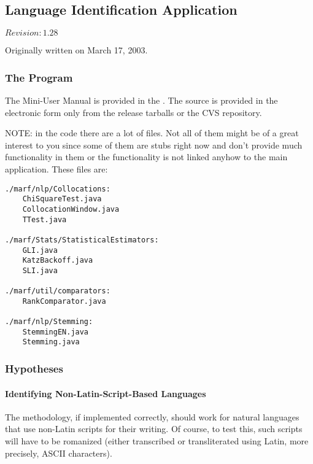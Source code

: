 \subsection{Language Identification Application}
\label{sect:lang-ident-app}

$Revision: 1.28 $

Originally written on March 17, 2003.

\subsubsection{The Program}

The Mini-User Manual is provided in the . The source
is provided in the electronic form only from the release tarballs or the CVS repository.

NOTE: in the code there are a lot of files. Not all of them might
be of a great interest to you since
some of them are stubs right now and don't provide much functionality in them
or the functionality is not linked anyhow to the main application.
These files are:

\begin{verbatim}
./marf/nlp/Collocations:
    ChiSquareTest.java
    CollocationWindow.java
    TTest.java

./marf/Stats/StatisticalEstimators:
    GLI.java
    KatzBackoff.java
    SLI.java

./marf/util/comparators:
    RankComparator.java

./marf/nlp/Stemming:
    StemmingEN.java
    Stemming.java
\end{verbatim}


\subsubsection{Hypotheses}

\paragraph{Identifying Non-Latin-Script-Based Languages}

The methodology, if implemented correctly, should work
for natural languages that use non-Latin scripts for
their writing. Of course, to test this, such scripts
will have to be romanized (either transcribed or transliterated
using Latin, more precisely, ASCII characters).

